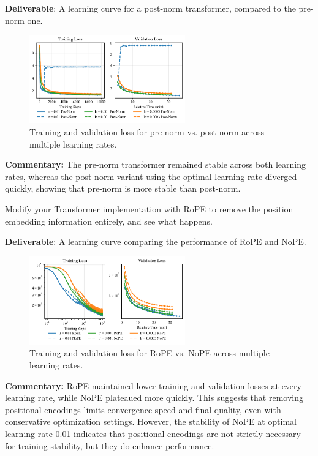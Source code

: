 \textbf{Deliverable}: A learning curve for a post-norm transformer, compared to the pre-norm one.

\begin{answer}
\begin{figure}[h]
    \centering
    \includegraphics[width=0.6\textwidth]{images/prenorm_ablation_experiments.pdf}
    \caption{Training and validation loss for pre-norm vs. post-norm across multiple learning rates.}
    \label{fig:prenorm_ablation}
\end{figure}

\textbf{Commentary:} The pre-norm transformer remained stable across both learning rates, whereas the post-norm variant using the optimal learning rate diverged quickly, showing that pre-norm is more stable than post-norm.
\end{answer}


Modify your Transformer implementation with RoPE to remove the position embedding information entirely, and see what happens.

\textbf{Deliverable}: A learning curve comparing the performance of RoPE and NoPE.

\begin{answer}

\begin{figure}[h]
    \centering
    \includegraphics[width=0.6\textwidth]{images/rope_ablation_experiments.pdf}
    \caption{Training and validation loss for RoPE vs. NoPE across multiple learning rates.}
    \label{fig:rope_ablation}
\end{figure}

\textbf{Commentary:} RoPE maintained lower training and validation losses at every learning rate, while NoPE plateaued more quickly. This suggests that removing positional encodings limits convergence speed and final quality, even with conservative optimization settings. However, the stability of NoPE at optimal learning rate 0.01 indicates that positional encodings are not strictly necessary for training stability, but they do enhance performance.

\end{answer}

